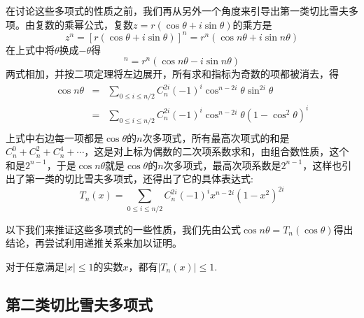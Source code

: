 在讨论这些多项式的性质之前，我们再从另外一个角度来引导出第一类切比雪夫多项。由复数的乘幂公式，复数$z=r(\cos{\theta}+i\sin{\theta})$的乘方是
\begin{equation*}
  z^n=[r(\cos{\theta}+i\sin{\theta})]^n = r^n(\cos{n\theta}+i\sin{n\theta})
\end{equation*}
在上式中将$\theta$换成$-\theta$得
\begin{equation*}
  [r(\cos{\theta}-i\sin{\theta})]^n = r^n(\cos{n\theta}-i\sin{n\theta})
\end{equation*}
两式相加，并按二项定理将左边展开，所有求和指标为奇数的项都被消去，得
\begin{eqnarray*}
  \cos{n\theta} & = & \sum_{0 \leqslant i \leqslant n/2}C_n^{2i}(-1)^i\cos^{n-2i}{\theta}\sin^{2i}{\theta} \\
  & = & \sum_{0 \leqslant i \leqslant n/2}C_n^{2i}(-1)^i\cos^{n-2i}{\theta}(1-\cos^2{\theta})^i \\
\end{eqnarray*}
上式中右边每一项都是$\cos{\theta}$的$n$次多项式，所有最高次项式的和是$C_n^0+C_n^2+C_n^4+\cdots$，这是对上标为偶数的二次项系数求和，由组合数性质，这个和是$2^{n-1}$，于是$\cos{n\theta}$就是$\cos{\theta}$的$n$次多项式，最高次项系数是$2^{n-1}$，这样也引出了第一类的切比雪夫多项式，还得出了它的具体表达式:
\begin{equation*}
  T_n(x) = \sum_{0 \leqslant i \leqslant n/2}C_n^{2i}(-1)^ix^{n-2i}(1-x^2)^{2i}
\end{equation*}

以下我们来推证这些多项式的一些性质，我们先由公式$\cos{n\theta}=T_n(\cos{\theta})$得出结论，再尝试利用递推关系来加以证明。

\begin{property}
  对于任意满足$|x|\leqslant 1$的实数$x$，都有$|T_n(x)| \leqslant 1$.
\end{property}



\subsection{第二类切比雪夫多项式}
\label{sec:second-chebyshev-polynome}

